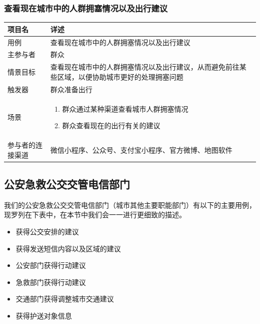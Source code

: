 \documentclass{ctexrep}
\begin{document}
\subsubsection{查看现在城市中的人群拥塞情况以及出行建议}
\begin{longtable}{p{2cm} | p{10cm}}
\hline
项目名 & 详述 \\
\hline
\hline
用例 & 查看现在城市中的人群拥塞情况以及出行建议\\
\hline
主参与者 & 群众\\
\hline
情景目标 &  查看现在城市中的人群拥塞情况以及出行建议，从而避免前往某些区域，以便协助城市更好的处理拥塞问题\\
\hline
触发器 & 群众准备出行\\
\hline
场景 & \begin{enumerate}
	\item 群众通过某种渠道查看城市人群拥塞情况
	\item 群众查看现在的出行有关的建议
\end{enumerate} \\
\hline
参与者的连接渠道 & 微信小程序、公众号、支付宝小程序、官方微博、地图软件\\
\hline
\end{longtable}

\subsection{公安急救公交交管电信部门}
我们的公安急救公交交管电信部门（城市其他主要职能部门）有以下的主要用例，现罗列在下表中，在本节中我们会一一进行更细致的描述。
\begin{itemize}
\item 获得公交安排的建议
\item 获得发送短信内容以及区域的建议 
\item 公安部门获得行动建议
\item 急救部门获得行动建议
\item 交通部门获得调整城市交通建议
\item 获得护送对象信息
\end{itemize}
\end{document}
